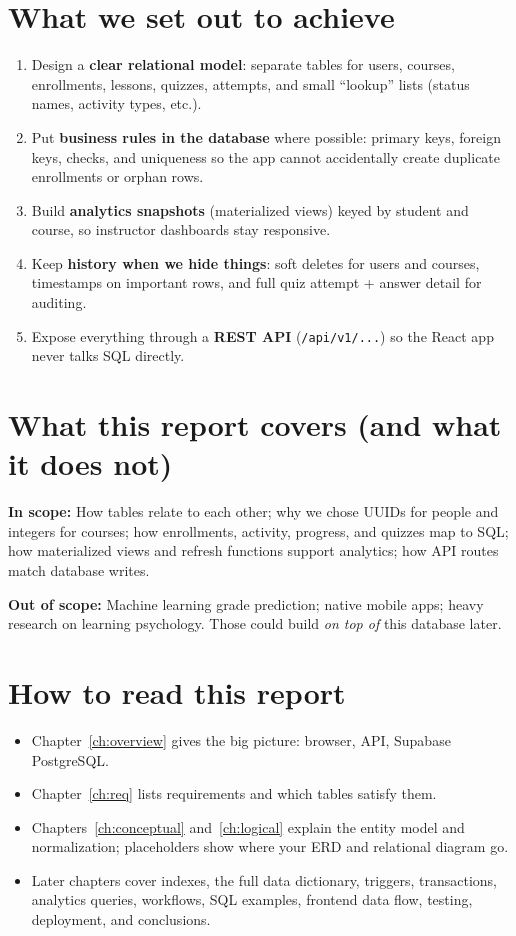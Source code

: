 \section{What we set out to achieve}
\begin{enumerate}[leftmargin=*]
  \item Design a \textbf{clear relational model}: separate tables for users, courses, enrollments, lessons, quizzes, attempts, and small ``lookup'' lists (status names, activity types, etc.).
  \item Put \textbf{business rules in the database} where possible: primary keys, foreign keys, checks, and uniqueness so the app cannot accidentally create duplicate enrollments or orphan rows.
  \item Build \textbf{analytics snapshots} (materialized views) keyed by student and course, so instructor dashboards stay responsive.
  \item Keep \textbf{history when we hide things}: soft deletes for users and courses, timestamps on important rows, and full quiz attempt + answer detail for auditing.
  \item Expose everything through a \textbf{REST API} (\texttt{/api/v1/...}) so the React app never talks SQL directly.
\end{enumerate}

\section{What this report covers (and what it does not)}
\textbf{In scope:} How tables relate to each other; why we chose UUIDs for people and integers for courses; how enrollments, activity, progress, and quizzes map to SQL; how materialized views and refresh functions support analytics; how API routes match database writes.

\textbf{Out of scope:} Machine learning grade prediction; native mobile apps; heavy research on learning psychology. Those could build \textit{on top of} this database later.

\section{How to read this report}
\begin{itemize}[leftmargin=*]
  \item Chapter~\ref{ch:overview} gives the big picture: browser, API, Supabase PostgreSQL.
  \item Chapter~\ref{ch:req} lists requirements and which tables satisfy them.
  \item Chapters~\ref{ch:conceptual} and~\ref{ch:logical} explain the entity model and normalization; placeholders show where your ERD and relational diagram go.
  \item Later chapters cover indexes, the full data dictionary, triggers, transactions, analytics queries, workflows, SQL examples, frontend data flow, testing, deployment, and conclusions.
\end{itemize}
